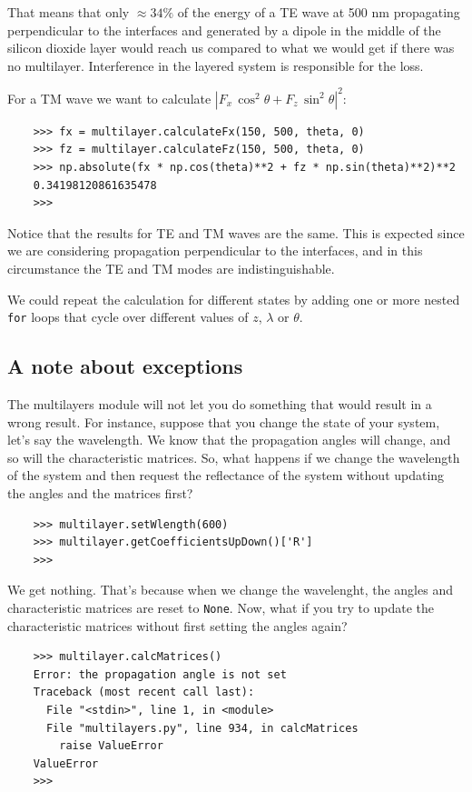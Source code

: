 \documentclass[a4paper,11pt,aps,final]{revtex4}
\begin{document}
That means that only $\approx 34\%$ of the energy of a TE wave at 500 nm propagating perpendicular to the interfaces and generated by a dipole in the middle of the silicon dioxide layer would reach us compared to what we would get if there was no multilayer. Interference in the layered system is responsible for the loss.

For a TM wave we want to calculate $|F_x\,\cos^2\theta + F_z\,\sin^2\theta|^2$:
\begin{verbatim}
    >>> fx = multilayer.calculateFx(150, 500, theta, 0)
    >>> fz = multilayer.calculateFz(150, 500, theta, 0)
    >>> np.absolute(fx * np.cos(theta)**2 + fz * np.sin(theta)**2)**2
    0.34198120861635478
    >>>
\end{verbatim}

Notice that the results for TE and TM waves are the same. This is expected since we are considering propagation perpendicular to the interfaces, and in this circumstance the TE and TM modes are indistinguishable.

We could repeat the calculation for different states by adding one or more nested \texttt{for} loops that cycle over different values of $z$, $\lambda$ or $\theta$.

\subsection{A note about exceptions}
The \textsf{multilayers} module will not let you do something that would result in a wrong result. For instance, suppose that you change the state of your system, let's say the wavelength. We know that the propagation angles will change, and so will the characteristic matrices. So, what happens if we change the wavelength of the system and then request the reflectance of the system without updating the angles and the matrices first?
\begin{verbatim}
    >>> multilayer.setWlength(600)
    >>> multilayer.getCoefficientsUpDown()['R']
    >>>
\end{verbatim}

We get nothing. That's because when we change the wavelenght, the angles and characteristic matrices are reset to \texttt{None}. Now, what if you try to update the characteristic matrices without first setting the angles again?
\begin{verbatim}
    >>> multilayer.calcMatrices()
    Error: the propagation angle is not set
    Traceback (most recent call last):
      File "<stdin>", line 1, in <module>
      File "multilayers.py", line 934, in calcMatrices
        raise ValueError
    ValueError
    >>>
\end{verbatim}
\end{document}
